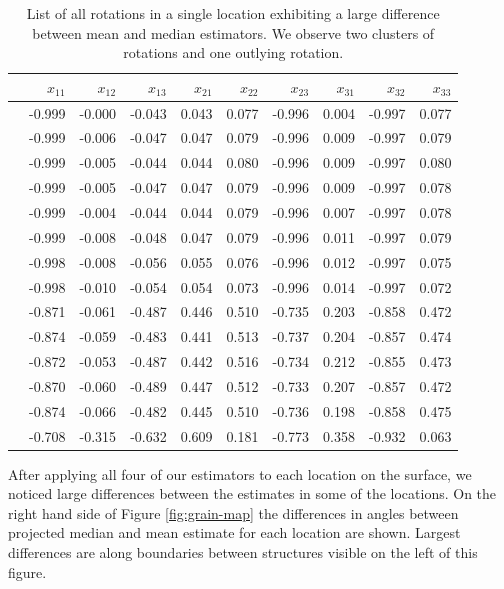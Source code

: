 
\begin{table}[h!]
\caption{\label{tab:rotations} List of all rotations in a single location exhibiting a large difference between mean and median estimators. We observe two clusters of rotations and one outlying rotation. }
\begin{center}
\footnotesize
\begin{tabular}{rrrrrrrrrr}
  \hline
 & $x_{11}$ & $x_{12}$& $x_{13}$& $x_{21}$& $x_{22}$& $x_{23}$& $x_{31}$& $x_{32}$& $x_{33}$ \\ 
  \hline
   & -0.999 & -0.000 & -0.043 & 0.043 & 0.077 & -0.996 & 0.004 & -0.997 & 0.077 \\ 
   & -0.999 & -0.006 & -0.047 & 0.047 & 0.079 & -0.996 & 0.009 & -0.997 & 0.079 \\ 
   & -0.999 & -0.005 & -0.044 & 0.044 & 0.080 & -0.996 & 0.009 & -0.997 & 0.080 \\ 
   & -0.999 & -0.005 & -0.047 & 0.047 & 0.079 & -0.996 & 0.009 & -0.997 & 0.078 \\ 
   & -0.999 & -0.004 & -0.044 & 0.044 & 0.079 & -0.996 & 0.007 & -0.997 & 0.078 \\ 
   & -0.999 & -0.008 & -0.048 & 0.047 & 0.079 & -0.996 & 0.011 & -0.997 & 0.079 \\ 
   & -0.998 & -0.008 & -0.056 & 0.055 & 0.076 & -0.996 & 0.012 & -0.997 & 0.075 \\ 
   & -0.998 & -0.010 & -0.054 & 0.054 & 0.073 & -0.996 & 0.014 & -0.997 & 0.072 \\ [5pt]
   & -0.871 & -0.061 & -0.487 & 0.446 & 0.510 & -0.735 & 0.203 & -0.858 & 0.472 \\ 
   & -0.874 & -0.059 & -0.483 & 0.441 & 0.513 & -0.737 & 0.204 & -0.857 & 0.474 \\ 
   & -0.872 & -0.053 & -0.487 & 0.442 & 0.516 & -0.734 & 0.212 & -0.855 & 0.473 \\ 
   & -0.870 & -0.060 & -0.489 & 0.447 & 0.512 & -0.733 & 0.207 & -0.857 & 0.472 \\ 
   & -0.874 & -0.066 & -0.482 & 0.445 & 0.510 & -0.736 & 0.198 & -0.858 & 0.475 \\ [5pt] 
 & -0.708 & -0.315 & -0.632 & 0.609 & 0.181 & -0.773 & 0.358 & -0.932 & 0.063 \\ 
   \hline
\end{tabular}
\end{center}
\end{table}
After applying all four of our estimators to each location on the surface, we noticed large differences between the estimates in some of the locations. On the right hand side of Figure \ref{fig:grain-map} the differences in angles between projected median and mean estimate for each location are shown. Largest differences are along boundaries between structures visible on the left of this figure.

